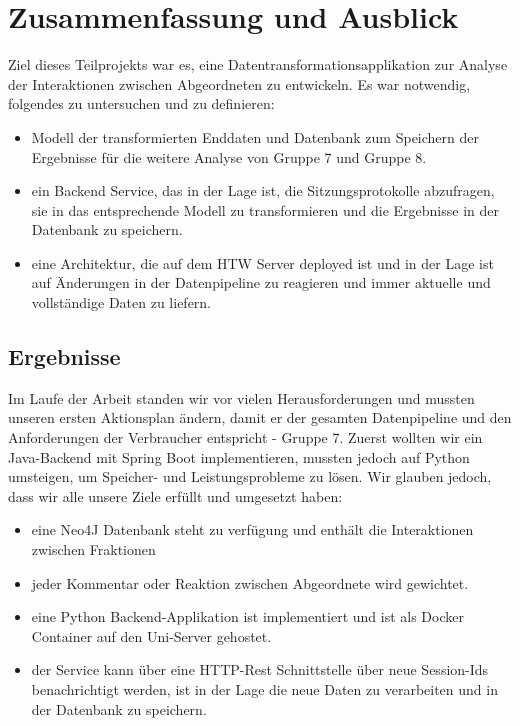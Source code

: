 
\section{Zusammenfassung und Ausblick}\label{sec:06_05_zusammenfassung}
Ziel dieses Teilprojekts war es, eine Datentransformationsapplikation zur Analyse der Interaktionen zwischen Abgeordneten zu entwickeln. Es war notwendig, folgendes zu untersuchen und zu definieren:
\begin{itemize}
  \item Modell der transformierten Enddaten und Datenbank zum Speichern der Ergebnisse für die weitere Analyse von Gruppe 7 und Gruppe 8. 
  \item ein Backend Service, das in der Lage ist, die Sitzungsprotokolle abzufragen, sie in das entsprechende Modell zu transformieren und die Ergebnisse in der Datenbank zu speichern.
  \item eine Architektur, die auf dem HTW Server deployed ist und in der Lage ist auf Änderungen in der Datenpipeline zu reagieren und immer aktuelle und vollständige Daten zu liefern. 
\end{itemize}

\subsection{Ergebnisse}
Im Laufe der Arbeit standen wir vor vielen Herausforderungen und mussten unseren ersten Aktionsplan ändern, damit er der gesamten Datenpipeline und den Anforderungen der Verbraucher entspricht - Gruppe 7. Zuerst wollten wir ein Java-Backend mit Spring Boot implementieren, mussten jedoch auf Python umsteigen, um Speicher- und Leistungsprobleme zu lösen. Wir glauben jedoch, dass wir alle unsere Ziele erfüllt und umgesetzt haben:
\begin{itemize}
    \item eine Neo4J Datenbank steht zu verfügung und enthält die Interaktionen zwischen Fraktionen
    \item jeder Kommentar oder Reaktion zwischen Abgeordnete wird gewichtet.
    \item eine Python Backend-Applikation ist implementiert und ist als Docker Container auf den Uni-Server gehostet.
    \item der Service kann über eine HTTP-Rest Schnittstelle über neue Session-Ids  benachrichtigt werden, ist in der Lage die neue Daten zu verarbeiten und in der Datenbank zu speichern.
\end{itemize}



